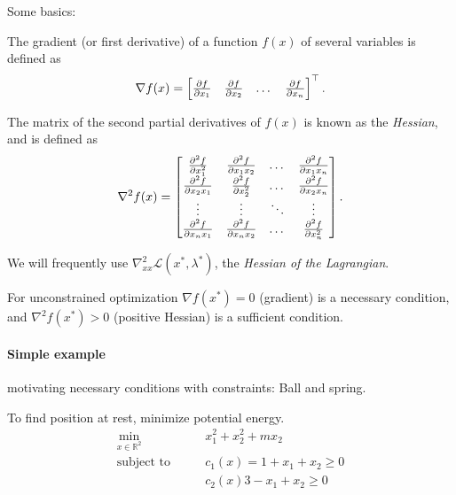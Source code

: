 \documentclass{article}
\begin{document}
\maketitle

Some basics:

\medskip The gradient (or first derivative) of a function $f(x)$ of several variables is defined as
\[
  \nabla f(x) = \begin{bmatrix}  \frac{\partial f}{\partial x_1} & \frac{\partial f}{\partial x_2} & \dots & \frac{\partial f}{\partial x_n} \end{bmatrix}^{\top}
  .\]

The matrix of the second partial derivatives of $f(x)$ is known as the \textit{Hessian}, and is defined as
\[
  \nabla ^2f(x) =
  \begin{bmatrix} 
    \frac{\partial^2 f}{\partial x_1^2} & \frac{\partial^2 f}{\partial x_1x_2} & \dots & \frac{\partial^2f}{\partial x_1x_n} \\
    \frac{\partial^2 f}{\partial x_2 x_1} & \frac{\partial ^2 f}{\partial x_2^2} & \dots & \frac{\partial ^2 f}{\partial x_2x_n} \\
    \vdots & \vdots & \ddots & \vdots \\
    \frac{\partial ^2 f}{\partial x_n x_1} & \frac{\partial ^2 f}{\partial x_n x_2} & \dots & \frac{\partial^2 f}{\partial x_n^2}
   \end{bmatrix}
  .\]

We will frequently use $\nabla_{xx}^2\mathcal{L}(x^*, \lambda^*)$, the \textit{Hessian of the Lagrangian}.

For unconstrained optimization $\nabla f(x^*) = 0$ (gradient) is a necessary condition, and $\nabla ^2f(x^*) > 0$ (positive Hessian) is a sufficient condition.

\paragraph{Simple example} motivating necessary conditions with constraints: Ball and spring.

\begin{minipage}[c]{0.5\textwidth}
\end{minipage}
\begin{minipage}[c]{0.5\textwidth}
  To find position at rest, minimize potential energy.
  \begin{align*}
    \min_{x\in \mathbb{R}^{2}} \qquad & x_1^2 + x_2^2 + mx_2          \\
    \text{subject to} \qquad          & c_1(x) = 1 + x_1 + x_2 \geq 0 \\
                                      & c_2(x) 3 - x_1 + x_2 \geq 0
  \end{align*}
\end{minipage}
\end{document}
